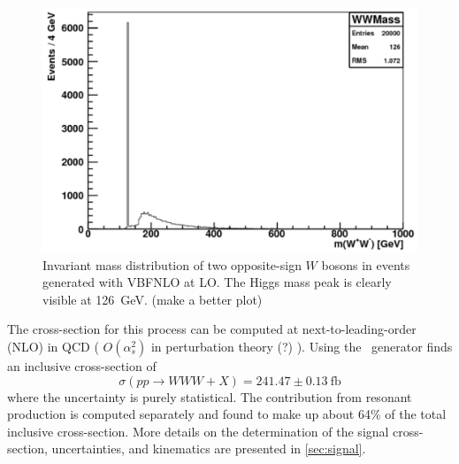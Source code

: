 \begin{figure}[ht]
\centering
\includegraphics[width=0.5\columnwidth]{figures/2l2j/mWW-parton.pdf}
\caption{ Invariant mass distribution of two opposite-sign $W$ bosons 
in \www events generated with VBFNLO at LO. The Higgs mass peak is clearly 
visible at 126~GeV. (make a better plot)}
\label{fig:mww_higgs}
\end{figure}



The cross-section for this process can be computed at 
next-to-leading-order (NLO) in QCD
( $O(\alpha_s^2)$ in perturbation theory (?) ). Using 
the \madgraph~generator finds an inclusive cross-section of 
\begin{equation}
\sigma(pp\rightarrow WWW + X) = 241.47 \pm 0.13~\textrm{fb}
\end{equation}
where the uncertainty is purely statistical.
The contribution from resonant production is computed separately
and found to make up about 64\% of the 
total inclusive cross-section.
More details on the determination of the signal cross-section, uncertainties,
and kinematics are presented in \sec\ref{sec:signal}.


